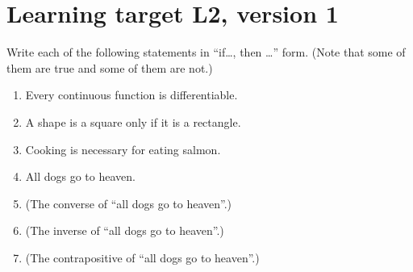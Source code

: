 \iffalse
\pagebreak
\section{Learning target L1, version 0}

Okay, so here's the real definition of a function: A \textbf{function} $f:X\to Y$ is a rule that assigns each input exactly one output. \textbf{Inputs} are elements of the \textbf{domain} $X$, and \textbf{outputs} are elements of the \textbf{codomain} $Y$.

\begin{enumerate}
    \item Write the definition of a function in logical symbols with proper quantifiers.
    \vfill
    \item An \textbf{injective} function (also called \textbf{one-to-one}) assigns each output to exactly one input. Translate that to properly quantified logical symbols.
    \vfill
    \item A \textbf{surjective} function (also called \textbf{onto}) assigns an input to every possible output. Logical symbols for this?
    \vfill
\end{enumerate}
\fi

\pagebreak
\section{Learning target L2, version 1}

Write each of the following statements in ``if\ldots, then \ldots'' form. (Note that some of them are true and some of them are not.)

\begin{enumerate}
    \item Every continuous function is differentiable. \vfill
    \item A shape is a square only if it is a rectangle. \vfill
    \item Cooking is necessary for eating salmon. \vfill
    \item All dogs go to heaven. \vfill
    \item (The converse of ``all dogs go to heaven''.) \vfill
    \item (The inverse of ``all dogs go to heaven''.) \vfill
    \item (The contrapositive of ``all dogs go to heaven''.) \vfill
    
\end{enumerate}


